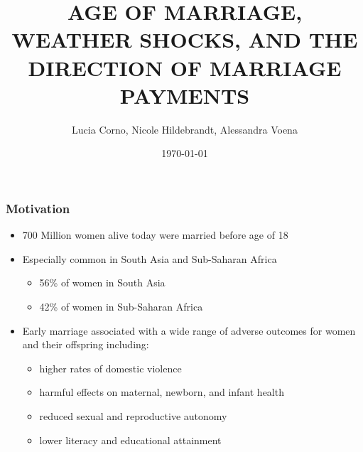 \documentclass{beamer}
\title[OSM Student Presentation]{AGE OF MARRIAGE, WEATHER SHOCKS, AND THE DIRECTION OF MARRIAGE
PAYMENTS} %
\author{Lucia Corno, Nicole Hildebrandt, Alessandra Voena} %
\institute[UofC] %
{
Alex Weinberg \\
University of Chicago \\ %
\medskip
\textit{weinberga@uchicago.edu} %
}
\date{\today} %
\begin{document}
\begin{frame}
\titlepage %
\end{frame}




\begin{frame}
\frametitle{Motivation}

\begin{itemize}

\item 700 Million women alive today were married before age of 18
\item Especially common in South Asia and Sub-Saharan Africa
  \begin{itemize}
    \item 56\% of women in South Asia
    \item 42\% of women in Sub-Saharan Africa
  \end{itemize}
\item Early marriage associated with a wide range of adverse outcomes for women and their offspring including:
  \begin{itemize}
    \item higher rates of domestic violence
    \item harmful effects on maternal, newborn, and infant health
    \item reduced sexual and reproductive autonomy
    \item lower literacy and educational attainment
  \end{itemize}
\end{itemize}

\end{frame}
\end{document}
